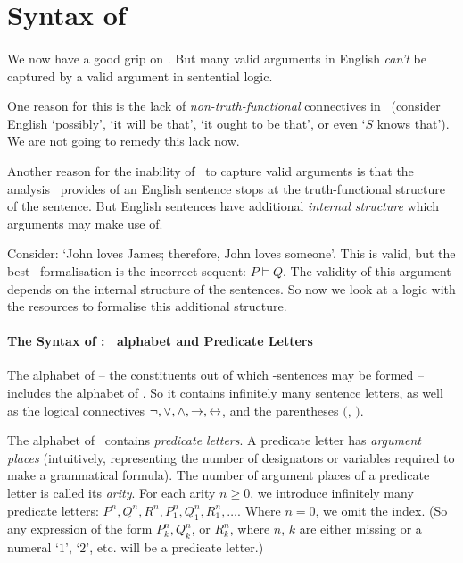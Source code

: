 



\section{Syntax of \texorpdfstring{\ltwo}{L2}}\label{ltwo}
\paragraph{\ltwo}

We now have a good grip on \lone. But many valid arguments in English \emph{can't} be captured by a valid argument in sentential logic. 

 One reason for this is the lack of \emph{non-truth-functional} connectives in \lone\ (consider English `possibly', `it will be that', `it ought to be that', or even `$S$ knows that'). We are not going to remedy this lack now. 

Another reason for the inability of \lone\ to capture valid arguments is that the analysis \lone\ provides of an English sentence stops at the truth-functional structure of the sentence. But English sentences have additional \emph{internal structure} which arguments may make use of.

Consider: `John loves James; therefore, John loves someone'. This is valid, but the best \lone\ formalisation is the incorrect sequent: $P\vDash Q$. The validity of this argument depends on the internal structure of the sentences. So now we look at a logic with the resources to formalise this additional structure.

\paragraph{The Syntax of \ltwo: \lone\ alphabet and Predicate Letters}

The alphabet of \ltwo – the constituents out of which \ltwo-sentences may be formed – includes the alphabet of \lone. So it contains infinitely many sentence letters, as well as the logical connectives $\neg,\vee,\wedge,\to,
\leftrightarrow$, and the parentheses $($, $)$.

The alphabet of \ltwo\ contains  \emph{predicate letters}. A predicate letter has \emph{argument places} (intuitively, representing the number of designators or variables required to make a grammatical formula). The number of argument places of a predicate letter is called its \emph{arity}. For each arity $n \geqslant 0$, we introduce infinitely many predicate letters: $P^{n},Q^{n},R^{n},P^{n}_{1},Q^{n}_{1},R^{n}_{1},\ldots$. Where $n=0$, we omit the index. (So any expression of the form $P^{n}_{k}, Q^{n}_{k}$, or $R^{n}_{k}$, where $n$, $k$ are either missing or a numeral `$1$', `$2$', etc. will be a predicate letter.)

